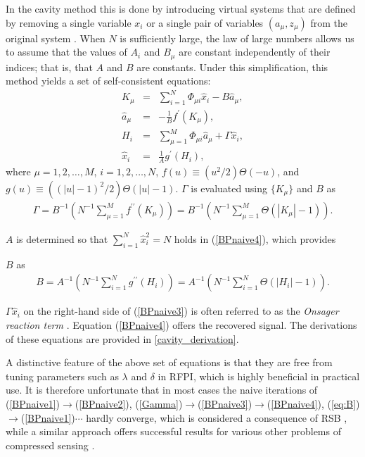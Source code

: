 \documentclass[12pt]{iopart}
\begin{document}
In the cavity method this is done by introducing virtual systems that are defined by removing a single variable $x_i$ or a single pair of variables $(a_\mu, z_\mu)$ from the original system \cite{cavity}. When $N$ is sufficiently large, the law of large numbers allows us to assume that the values of $A_i$ and $B_\mu$ are constant independently of their indices; that is, that $A$ and $B$ are constants. Under this simplification, this method yields a set of self-consistent equations: 
\begin{eqnarray}
K_\mu &=& \sum_{i=1}^N \Phi_{\mu i} \hat{x}_i-B \hat{a}_\mu,  \label{BPnaive1} \\
\hat{a}_\mu &=& -\frac{1}{B} f^{\prime}\left (K_\mu   \right ),   \label{BPnaive2}\\
H_i &=& \sum_{\mu =1}^M \Phi_{\mu i} \hat{a}_\mu + \Gamma \hat{x}_i, \label{BPnaive3}\\
\hat{x}_i &=& \frac{1}{A} g^{\prime}\left (H_i  \right ),  \label{BPnaive4}
\end{eqnarray}
where $\mu=1,2,\ldots, M$, $i=1,2,\ldots,N$, $f(u)\equiv (u^2/2)\Theta(-u)$, and $g(u)\equiv \left ((|u|-1)^2/2 \right ) \Theta \left (|u|-1 \right )$. 
 $\Gamma$ is evaluated using $\{K_\mu\}$ and $B$ as
\begin{eqnarray}
\Gamma=B^{-1} \left (N^{-1} \sum_{\mu=1}^M f^{\prime \prime} \left (K_\mu \right ) \right ) =B^{-1} \left (N^{-1} \sum_{\mu=1}^M \Theta \left (|K_\mu | -1 \right ) \right ). \label{Gamma} 
\end{eqnarray}

$A$ is determined so that $\sum_{i=1}^N \hat{x}_i^2 =N$ holds in (\ref{BPnaive4}), 
 which provides 

$B$ as
\begin{eqnarray}
B=A^{-1}\left (N^{-1} \sum_{i=1}^N g^{\prime \prime} \left (H_i \right ) \right ) =A^{-1} \left (N^{-1} \sum_{i=1}^N \Theta \left (|H_i | -1\right ) \right ). \label{eq:B}
\end{eqnarray}

$\Gamma \hat{x}_i$ on the right-hand side of (\ref{BPnaive3}) is often referred to as the {\em Onsager reaction term} \cite{Onsager1,Onsager2}. Equation (\ref{BPnaive4}) offers the recovered signal. The derivations of these equations are provided in \ref{cavity_derivation}. 

A distinctive feature of the above set of equations is that they are free from tuning parameters such as $\lambda$ and $\delta$ in RFPI, which is highly beneficial in practical use. It is therefore unfortunate that in most cases the naive iterations of (\ref{BPnaive1})$\rightarrow$(\ref{BPnaive2}), (\ref{Gamma})$\rightarrow$(\ref{BPnaive3})$\rightarrow$(\ref{BPnaive4}), (\ref{eq:B})$\rightarrow$(\ref{BPnaive1})$\cdots$ hardly converge, which is considered a consequence of RSB \cite{Kabashima2003}, 
while a similar approach offers successful results for various other problems of compressed sensing
\cite{Rangan2011,Bayati2011}.
\end{document}
